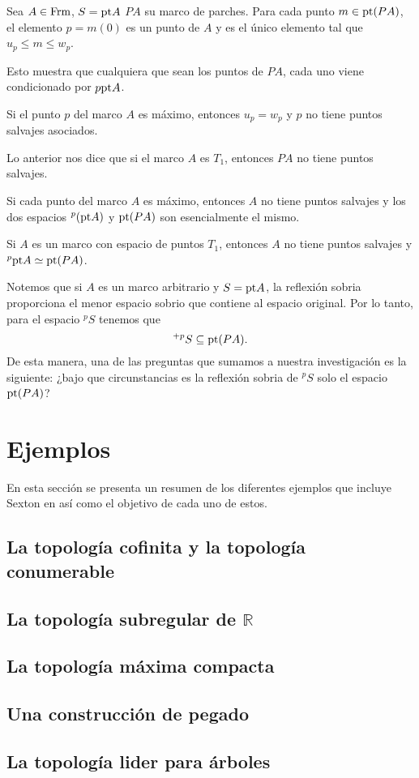 \begin{lem}\label{Lema9.4.2}
    Sea $A\in \mathrm{Frm}$, $S=\mathrm{pt} A$ $PA$ su marco de parches. Para cada punto $m\in \mathrm{pt}(PA)$, el elemento $p=m(0)$ es un punto de $A$ y es el único elemento tal que $u_p\leq m\leq w_p$.
\end{lem}

Esto muestra que cualquiera que sean los puntos de $PA$, cada uno viene condicionado por $p\mathrm{pt} A$.\\

\begin{lem}\label{Lema9.4.3}
    Si el punto $p$ del marco $A$ es máximo, entonces $u_p=w_p$ y $p$ no tiene puntos salvajes asociados.
\end{lem}

Lo anterior nos dice que si el marco $A$ es $T_1$, entonces $PA$ no tiene puntos salvajes.

\begin{thm}\label{Teorema9.4.4}
    Si cada punto del marco $A$ es máximo, entonces $A$ no tiene puntos salvajes y los dos espacios $^p(\mathrm{pt} A)$ y $\mathrm{pt}(PA)$ son esencialmente el mismo.
\end{thm}

\begin{cor}\label{Corolario9.4.5}
    Si $A$ es un marco con espacio de puntos $T_1$, entonces $A$ no tiene puntos salvajes y $^p\mathrm{pt} A\simeq \mathrm{pt} (PA)$.
\end{cor}

Notemos que si $A$ es un marco arbitrario y $S=\mathrm{pt} A$, la reflexión sobria proporciona el menor espacio sobrio que contiene al espacio original. Por lo tanto, para el espacio $^pS$ tenemos que
\[
^{+p}S\subseteq \mathrm{pt} (PA).
\]
De esta manera, una de las preguntas que sumamos a nuestra investigación es la siguiente: ¿bajo que circunstancias es la reflexión sobria de $^pS$ solo el espacio $\mathrm{pt}(PA)$?

\section{Ejemplos}\label{Ejemplos Rosy}

En esta sección se presenta un resumen de los diferentes ejemplos que incluye Sexton en \cite{R.S.} así como el objetivo de cada uno de estos.

\subsection{La topología cofinita y la topología conumerable}

\subsection{La topología subregular de $\mathbb{R}$}

\subsection{La topología máxima compacta}

\subsection{Una construcción de pegado}

\subsection{La topología lider para árboles}